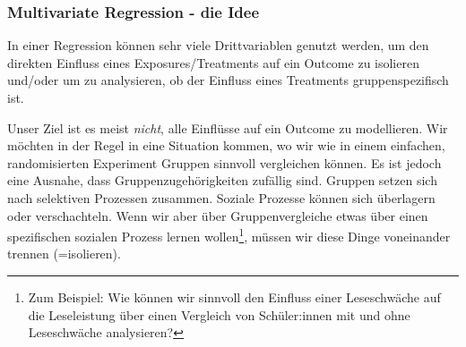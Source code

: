 \documentclass[18pt, aspectratio=169]{beamer}
\begin{document}
\begin{frame}
\frametitle{Multivariate Regression - die Idee}

In einer Regression können sehr viele Drittvariablen genutzt werden, um den direkten Einfluss eines Exposures/Treatments auf ein Outcome zu isolieren und/oder um zu analysieren, ob der Einfluss eines Treatments gruppenspezifisch ist.

\vfill

Unser Ziel ist es meist \textit{nicht}, alle Einflüsse auf ein Outcome zu modellieren. Wir möchten in der Regel in eine Situation kommen, wo wir wie in einem einfachen, randomisierten Experiment Gruppen sinnvoll vergleichen können. Es ist jedoch eine Ausnahe, dass Gruppenzugehörigkeiten zufällig sind. Gruppen setzen sich nach selektiven Prozessen zusammen. Soziale Prozesse können sich überlagern oder verschachteln. Wenn wir aber über Gruppenvergleiche etwas über einen spezifischen sozialen Prozess lernen wollen\footnote{Zum Beispiel: Wie können wir sinnvoll den Einfluss einer Leseschwäche auf die Leseleistung über einen Vergleich von Schüler:innen mit und ohne Leseschwäche analysieren?}, müssen wir diese Dinge voneinander trennen (=isolieren).  

\end{frame}
\end{document}
